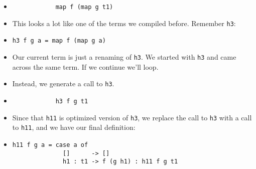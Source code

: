 \documentclass{beamer}
\begin{document}
\begin{frame}[fragile]

    \begin{itemize}[<+->]

        \item[]
            \begin{verbatim}
            map f (map g t1)
            \end{verbatim}

        \item[] This looks a lot like one of the terms we compiled before.
            Remember \texttt{h3}:

        \item[]
            \begin{verbatim}
h3 f g a = map f (map g a)
            \end{verbatim}

        \item[] Our current term is just a renaming of \texttt{h3}. We started
            with \texttt{h3} and came across the same term. If we continue we'll
            loop.

        \item[] Instead, we generate a call to \texttt{h3}.

        \item[]
            \begin{verbatim}
            h3 f g t1
            \end{verbatim}

        \item[] Since that \texttt{h11} is optimized version of \texttt{h3}, we
            replace the call to \texttt{h3} with a call to \texttt{h11}, and we
            have our final definition:

        \item[]
            \begin{verbatim}
h11 f g a = case a of
              []      -> []
              h1 : t1 -> f (g h1) : h11 f g t1
            \end{verbatim}

    \end{itemize}

\end{frame}
\end{document}
